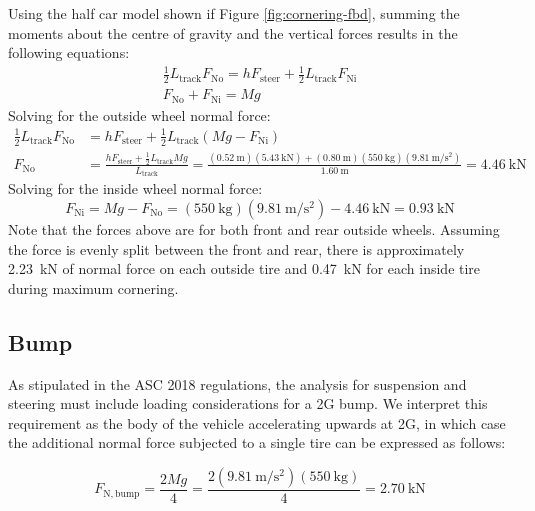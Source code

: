 \documentclass[10pt]{article}
\begin{document}
Using the half car model shown if Figure \ref{fig:cornering-fbd}, summing the moments about the centre of gravity and the vertical forces results in the following equations: 
\begin{gather}
\frac{1}{2}L_\mathrm{track}F_\mathrm{No} = hF_\mathrm{steer} + \frac{1}{2}L_\mathrm{track}F_\mathrm{Ni} \\
F_\mathrm{No} + F_\mathrm{Ni} = Mg
\end{gather}
Solving for the outside wheel normal force: 
\begin{equation}
\begin{split}
\frac{1}{2}L_\mathrm{track}F_\mathrm{No} &= hF_\mathrm{steer} + \frac{1}{2}L_\mathrm{track}(Mg - F_\mathrm{Ni})\\
F_\mathrm{No} &= \frac{hF_\mathrm{steer} + \frac{1}{2}L_\mathrm{track}Mg}{L_\mathrm{track}} = \frac{(\SI{0.52}{\metre})(\SI{5.43}{\kilo\newton})+(\SI{0.80}{\metre})(\SI{550}{\kilo\gram})\left(\SI{9.81}{\metre\per\second\squared}\right)}{\SI{1.60}{\metre}} = \SI{4.46}{\kilo\newton}
\end{split}
\end{equation}
Solving for the inside wheel normal force: 
\begin{equation}
F_\mathrm{Ni} = Mg - F_\mathrm{No} = (\SI{550}{\kilo\gram})\left(\SI{9.81}{\metre\per\second\squared}\right) - \SI{4.46}{\kilo\newton} = \SI{0.93}{\kilo\newton}
\end{equation}
Note that the forces above are for both front and rear outside wheels. Assuming the force is evenly split between the front and rear, there is approximately \SI{2.23}{\kilo\newton} of normal force on each outside tire and \SI{0.47}{\kilo\newton} for each inside tire during maximum cornering.
 
\subsection{Bump}
As stipulated in the ASC 2018 regulations, the analysis for suspension and steering must include loading considerations for a 2G bump. We interpret this requirement as the body of the vehicle accelerating upwards at 2G, in which case the additional normal force subjected to a single tire can be expressed as follows: 

\begin{equation}
F_\mathrm{N,bump} = \frac{2Mg}{4} = \frac{2(\SI{9.81}{\metre\per\second\squared})(\SI{550}{\kilo\gram})}{4} = \SI{2.70}{\kilo\newton}
\end{equation} 
 
\end{document}
